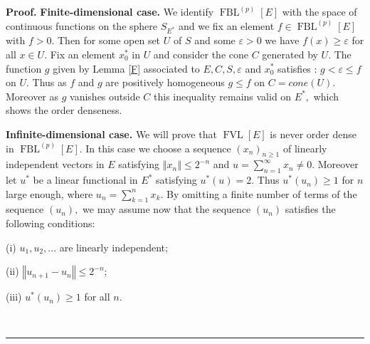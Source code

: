 \documentclass[12pt]{article}%
\newenvironment{proof}[1][Proof]{\noindent\textbf{#1.} }{\ \rule{0.5em}{0.5em}}
\begin{document}
\begin{proof}
\textbf{Finite-dimensional case.} We identify $\operatorname*{FBL}%
\nolimits^{\left(  p\right)  }\left[  E\right]  $ with the space of continuous
functions on the sphere $S_{E^{\ast}}$ and we fix an element $f\in
\operatorname*{FBL}\nolimits^{\left(  p\right)  }\left[  E\right]  $ with
$f>0.$ Then for some open set $U$ of $S$ and some $\varepsilon>0$ we have
$f\left(  x\right)  \geq\varepsilon$ for all $x\in U.$ Fix an element
$x_{0}^{\ast}$ in $U$ and consider the cone $C$ generated by $U.$ The function
$g$ given by Lemma \ref{F} associated to $E,C,S,\varepsilon$ and $x_{0}^{\ast
}$ satisfies : $g<\varepsilon\leq f$ on $U.$ Thus as $f$ and $g$ are
positively homogeneous $g\leq f$ on $C=cone\left(  U\right)  .$ Moreover as
$g$ vanishes outside $C$ this inequality remains valid on $E^{\ast},$ which
shows the order denseness.

\textbf{Infinite-dimensional case.} We will prove that $\operatorname*{FVL}%
\left[  E\right]  $ is never order dense in $\operatorname*{FBL}%
\nolimits^{(p)}\left[  E\right]  .$ In this case we choose a sequence $\left(
x_{n}\right)  _{n\geq1}$ of linearly independent vectors in $E$ satisfying
$\left\Vert x_{n}\right\Vert \leq2^{-n}$ and $u=%
{\textstyle\sum\limits_{n=1}^{\infty}}
x_{n}\neq0.$ Moreover let $u^{\ast}$ be a linear functional in $E^{\ast}$
satisfying $u^{\ast}\left(  u\right)  =2.$ Thus $u^{\ast}\left(  u_{n}\right)
\geq1$ for $n$ large enough, where $u_{n}=%
{\textstyle\sum\limits_{k=1}^{n}}
x_{k}.$ By omitting a finite number of terms of the sequence $\left(
u_{n}\right)  ,$ we may assume now that the sequence $\left(  u_{n}\right)  $
satisfies the following conditions:

(i) $u_{1},u_{2},...$ are linearly independent;

(ii) $\left\Vert u_{n+1}-u_{n}\right\Vert \leq2^{-n};$

(iii) $u^{\ast}\left(  u_{n}\right)  \geq1$ for all $n.$


\end{proof}
\end{document}
